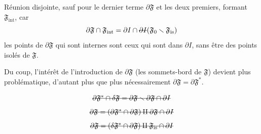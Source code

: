 \documentclass[11pt,a4paper]{article}
\begin{document}

Réunion disjointe, sauf pour le  dernier terme $\partial\mathfrak{F}$ et les deux premiers, formant $\mathfrak{F}_{\mathrm{int}}$, car
\[
  \partial\mathfrak{F} \cap \mathfrak{F}_{\mathrm{int}} = \partial I \cap \text{\struck{$\partial I$}} (\mathfrak{F}_0 \smallsetminus \mathfrak{F}_{\mathrm{is}})
\]
les points de $\partial\mathfrak{F}$ qui sont internes sont ceux  qui sont dans $\partial I$, sans être des points isolés de $\mathfrak{F}$.


Du coup, l'intérêt de l'introduction de $\partial\mathfrak{F}$  (les sommets-bord de $\mathfrak{F}$) devient plus problématique, d'autant plus que   plus   nécessairement $\partial\mathfrak{F} = \partial\mathfrak{F}^{*}$.

\[
  \text{\struck{$\partial\mathfrak{F}^{*} \cap \delta\mathfrak{F} = \partial\mathfrak{F} \smallsetminus \partial\mathfrak{F} \cap \partial I$}}
\]
\[
  \text{\struck{$\partial\mathfrak{F} = (\partial\mathfrak{F}^{*} \cap \partial\mathfrak{F}) \amalg \partial\mathfrak{F} \cap \partial I$}}
\]
\[
  \text{\struck{$\partial\mathfrak{F} = (\delta\mathfrak{F}^{*} \cap \partial\mathfrak{F}) \amalg \mathfrak{F}_{\mathrm{is}} \cap \partial I$}}
\]
\end{document}
